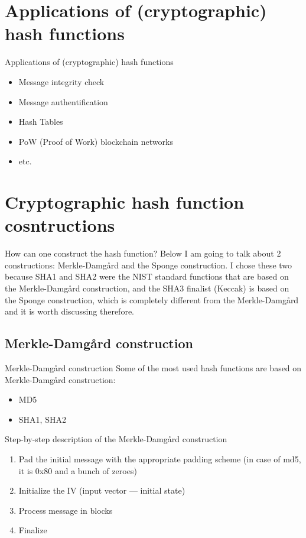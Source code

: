 \documentclass{beamer}
\begin{document}
\section{Applications of (cryptographic) hash functions}

\begin{frame}{Applications of (cryptographic) hash functions}
    \begin{itemize}
        \item Message integrity check 
        \item Message authentification
        \item Hash Tables
        \item PoW (Proof of Work) blockchain networks
        \item etc.
    \end{itemize}
\end{frame}

\section{Cryptographic hash function cosntructions}

\begin{frame}{How can one construct the hash function?}
    Below I am going to talk about 2 constructions: Merkle-Damgård and the 
    Sponge construction. I chose these two because SHA1 and SHA2 were the NIST 
    standard functions that are based on the Merkle-Damgård construction, and 
    the SHA3 finalist (Keccak) is based on the Sponge construction, which is 
    completely different from the Merkle-Damgård and it is worth discussing 
    therefore.
\end{frame}

\subsection{Merkle-Damgård construction}

\begin{frame}{Merkle-Damgård construction}
    Some of the most used hash functions are based on Merkle-Damgård 
    construction:
    \begin{itemize}
        \item MD5
        \item SHA1, SHA2
    \end{itemize}
\end{frame}

\begin{frame}{Step-by-step description of the Merkle-Damgård construction}
    \begin{enumerate}
        \item Pad the initial message with the appropriate padding scheme 
        (in case of md5, it is 0x80 and a bunch of zeroes)
        \item Initialize the IV (input vector --- initial state)
        \item Process message in blocks
        \item Finalize
    \end{enumerate}
\end{frame}
\end{document}
